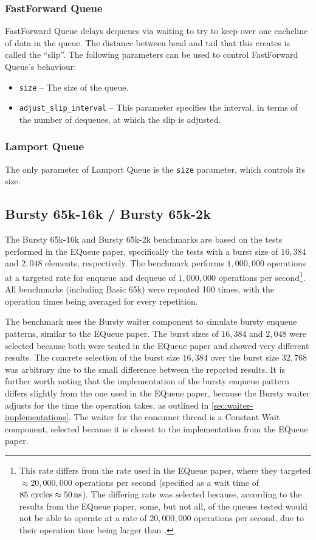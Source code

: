 \subsubsection*{FastForward Queue}
FastForward Queue delays dequeues via waiting to try to keep over one cacheline of data in the queue\cite{FastForward}.
The distance between head and tail that this creates is called the ``slip''.
The following parameters can be used to control FastForward Queue's behaviour:
\begin{itemize}
    \item \texttt{size} -- The size of the queue.
    \item \texttt{adjust\_slip\_interval} -- This parameter specifies the interval, in terms of the number of dequeues,
        at which the slip is adjusted.
\end{itemize}

\subsubsection*{Lamport Queue}
The only parameter of Lamport Queue is the \texttt{size} parameter, which controls its size\cite{Lamport}.

\subsection{Bursty 65k-16k / Bursty 65k-2k}
\label{sec:bench-bursty-65k-16k}

The Bursty 65k-16k and Bursty 65k-2k benchmarks are based on the tests performed in the EQueue paper,
specifically the tests with a burst size of $16,384$ and $2,048$ elements, respectively.
The benchmark performs $1,000,000$ operations at a targeted rate for enqueue and dequeue of $1,000,000$
operations per second\footnote{This rate differs from the rate used in the EQueue paper, where they targeted
    $\approx 20,000,000$ operations per second (specified as a wait time of $85\text{ cycles}\approx \SI{50}{\nano\second}$).
    The differing rate was selected because, according to the results from the EQueue paper, some, but not all, of the
    queues tested would not be able to operate at a rate of $20,000,000$ operations per second, due to their
operation time being larger than \cite{EQueue}.}.
All benchmarks (including Basic 65k) were repeated 100 times, with the operation times being averaged for
every repetition.

The benchmark uses the Bursty waiter component to simulate bursty enqueue patterns, similar to the EQueue paper.
The burst sizes of $16,384$ and $2,048$ were selected because both were tested in the EQueue paper and showed
very different results.
The concrete selection of the burst size $16,384$ over the burst size $32,768$ was arbitrary due to the small
difference between the reported results.
It is further worth noting that the implementation of the bursty enqueue pattern differs slightly from the
one used in the EQueue paper, because the Bursty waiter adjusts for the time the operation takes, as outlined
in \autoref{sec:waiter-implementations}.
The waiter for the consumer thread is a Constant Wait component, selected because it is closest to the
implementation from the EQueue paper.

